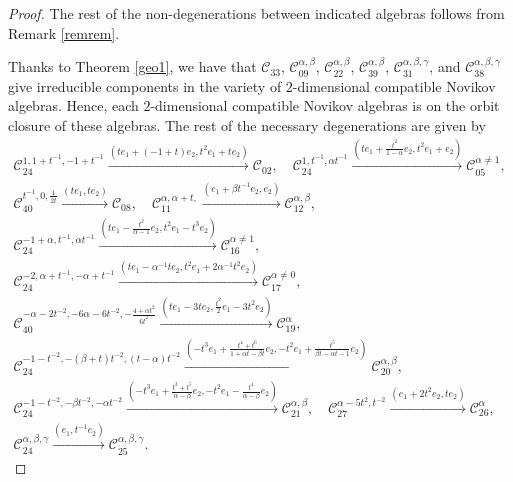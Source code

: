 \documentclass[10pt,a4paper]{amsart}
\numberwithin{equation}{section}
\begin{document}
\begin{proof}
The rest of the non-degenerations between indicated algebras follows from Remark \ref{remrem}.

Thanks to Theorem \ref{geo1}, we have that
$ \mathcal{C}_{33}$,
$ \mathcal{C}_{09}^{\alpha,\beta}$,
$ \mathcal{C}_{22}^{\alpha,\beta}$,
$ \mathcal{C}_{39}^{\alpha,\beta}$,
$ \mathcal{C}_{31}^{\alpha,\beta, \gamma}$, and
$ \mathcal{C}_{38}^{\alpha,\beta,\gamma}$
 give irreducible components in the variety of $2$-dimensional compatible Novikov algebras.
 Hence, each $2$-dimensional compatible Novikov algebras is on the orbit closure of these algebras. The rest of the necessary degenerations are given by
\begin{gather*}
 \mathcal{C}_{24}^{ 1,1+ t^{-1}, -1+ t^{-1}} \xrightarrow{ (te_1 +(-1+t) e_2, t^{2}e_1+t e_2 )} \mathcal{C}_{02} ,\quad
 \mathcal{C}_{24}^{ 1, t^{-1}, \alpha t^{-1}} \xrightarrow{ (te_1 +\frac{t^2}{1-\alpha} e_2, t^{2}e_1+ e_2 )} \mathcal{C}_{05}^{\alpha\neq 1} ,\\
 \mathcal{C}_{40}^{t^{-1},0, \frac{1}{2t}} \xrightarrow{ (te_1, te_2)} \mathcal{C}_{08} ,\quad
 \mathcal{C}_{11}^{\alpha,\alpha+t, } \xrightarrow{ (e_1+\beta t^{-1} e_2, e_2)} \mathcal{C}_{12}^{\alpha,\beta} ,\\
 \mathcal{C}_{24}^{ -1+\alpha, t^{-1}, \alpha t^{-1}} \xrightarrow{ (te_1 -\frac{t^2}{\alpha-1} e_2, t^{2}e_1-t^3 e_2 )} \mathcal{C}_{16}^{\alpha\neq 1} ,\\
 \mathcal{C}_{24}^{ -2, \alpha+t^{-1}, -\alpha +t^{-1}} \xrightarrow{ (te_1 -\alpha^{-1}t e_2, t^{2}e_1+2\alpha^{-1}t^2 e_2 )} \mathcal{C}_{17}^{\alpha\neq 0} ,\\
 \mathcal{C}_{40}^{ -\alpha -2t^{-2}, -6\alpha -6t^{-2}, -\frac{4+\alpha t^2}{6t^2}} \xrightarrow{ (te_1-3 te_2, \frac{t^2}{2}e_1-3 t^2e_2 )} \mathcal{C}_{19}^{\alpha} ,\\
 \mathcal{C}_{24}^{ -1-t^{-2}, -(\beta+t)t^{-2}, (t-\alpha) t^{-2}} \xrightarrow{ (-t^3e_1 +\frac{t^4+t^6}{1+\alpha t -\beta t} e_2, -t^{2}e_1+ \frac{t^5}{\beta t -\alpha t -1}e_2 )} \mathcal{C}_{20}^{\alpha,\beta} ,\\
 \mathcal{C}_{24}^{ -1-t^{-2}, -\beta t^{-2}, -\alpha t^{-2}} \xrightarrow{ (-t^3e_1 +\frac{t^3+t^5}{\alpha -\beta } e_2, -t^{2}e_1- \frac{t^4}{ \alpha -\beta}e_2 )} \mathcal{C}_{21}^{\alpha,\beta} ,\quad
 \mathcal{C}_{27}^{\alpha -5t^2,t^{-2}} \xrightarrow{ (e_1 + 2t^2 e_2, t e_2 )} \mathcal{C}_{26}^{\alpha} ,\\
 \mathcal{C}_{24}^{ \alpha, \beta, \gamma} \xrightarrow{ (e_1, t^{-1}e_2 )} \mathcal{C}_{25}^{\alpha, \beta, \gamma}. \tag*{\qed}
\end{gather*} \renewcommand{\qed}{}
\end{proof}
\end{document}
